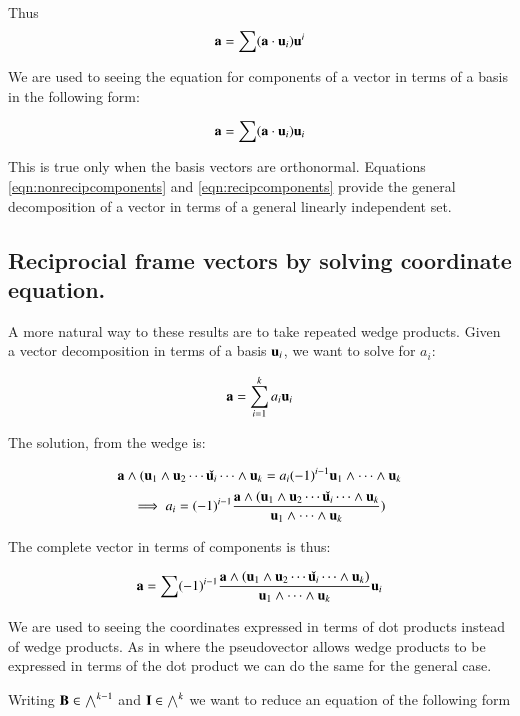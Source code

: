 \documentclass{article}      %
\begin{document}
Thus
\begin{equation}\label{eqn:recipcomponents}
\mathbf{a} = \sum (\mathbf{a} \cdot \mathbf{u}_i) \mathbf{u}^i
\end{equation}

We are used to seeing the equation for components of a vector in terms of a
basis in the following form: 

\begin{equation}
\mathbf{a} = \sum (\mathbf{a} \cdot \mathbf{u}_i) \mathbf{u}_i
\end{equation}

This is true only when the basis vectors are orthonormal.
Equations
\ref{eqn:nonrecipcomponents} and \ref{eqn:recipcomponents} provide the
general decomposition of a vector in terms of a general linearly independent
set.

\subsection{ Reciprocial frame vectors by solving coordinate equation. }

A more natural way to these results are to take repeated wedge products.
Given a vector decomposition in terms of a basis ${\mathbf{u}_i}$, we want to solve for $a_i$:

\[
\mathbf{a} = \sum_{i=1}^k a_i \mathbf{u}_i
\]

The solution, from the wedge is:

\[
\mathbf{a} \wedge (\mathbf{u}_1 \wedge \mathbf{u}_2 \cdots \check{\mathbf{u}_i} \cdots \wedge \mathbf{u}_k  = a_i (-1)^{i-1} \mathbf{u}_1 \wedge \cdots \wedge \mathbf{u}_k
\]
\[
\implies
a_i = 
(-1)^{i-1} 
\frac{\mathbf{a} \wedge (\mathbf{u}_1 \wedge \mathbf{u}_2 \cdots \check{\mathbf{u}_i} \cdots \wedge \mathbf{u}_k}{ \mathbf{u}_1 \wedge \cdots \wedge \mathbf{u}_k })
\]

The complete vector in terms of components is thus:

\begin{equation}\label{eqn:coordinateswedge}
\mathbf{a} =
\sum(-1)^{i-1} 
\frac{\mathbf{a} \wedge \left(\mathbf{u}_1 \wedge \mathbf{u}_2 \cdots \check{\mathbf{u}_i} \cdots \wedge \mathbf{u}_k\right)}{ \mathbf{u}_1 \wedge \cdots \wedge \mathbf{u}_k } \mathbf{u}_i
\end{equation}

We are used to seeing the coordinates expressed in terms of dot products instead of wedge products.  As in  where
the pseudovector allows wedge products to be expressed in terms of the dot product we can do the same for the general case.

Writing $\mathbf{B} \in \bigwedge^{k-1}$ and $\mathbf{I} \in \bigwedge^k$ we want to reduce an equation of the following form
\end{document}
